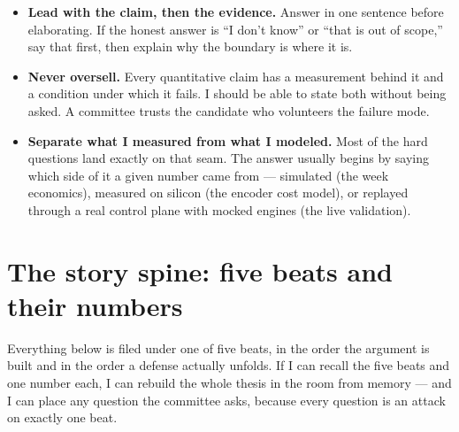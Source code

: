 \documentclass[11pt,a4paper]{article}
\begin{document}
\begin{itemize}
  \item \textbf{Lead with the claim, then the evidence.} Answer in one sentence
  before elaborating. If the honest answer is ``I don't know'' or ``that is out
  of scope,'' say that first, then explain why the boundary is where it is.

  \item \textbf{Never oversell.} Every quantitative claim has a measurement
  behind it and a condition under which it fails. I should be able to state both
  without being asked. A committee trusts the candidate who volunteers the
  failure mode.

  \item \textbf{Separate what I measured from what I modeled.} Most of the hard
  questions land exactly on that seam. The answer usually begins by saying which
  side of it a given number came from --- simulated (the week economics),
  measured on silicon (the encoder cost model), or replayed through a real
  control plane with mocked engines (the live validation).
\end{itemize}

\section{The story spine: five beats and their numbers}

Everything below is filed under one of five beats, in the order the argument
is built and in the order a defense actually unfolds. If I can recall the
five beats and one number each, I can rebuild the whole thesis in the room
from memory --- and I can place any question the committee asks, because
every question is an attack on exactly one beat.
\end{document}
